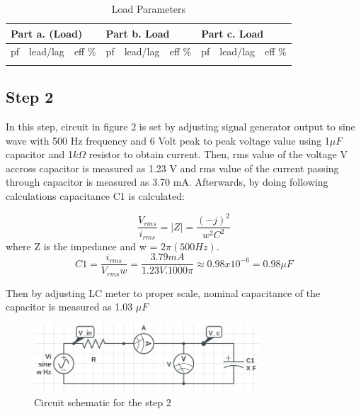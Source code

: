 \documentclass[letterpaper,12pt]{article}
\begin{document}
\begin{table}[H]
  \begin{center}
    \caption{Load Parameters}
    \vspace{2mm}
 \begin{tabular}{||lll|lll|lll||}
    \hline
    \multicolumn{3}{|l|}{Part a. (Load)}                            & \multicolumn{3}{l|}{Part b. Load}                            & \multicolumn{3}{l|}{Part c. Load}                            \\ \hline
    \multicolumn{1}{|l|}{pf} & \multicolumn{1}{l|}{lead/lag} & eff \(\%\) & \multicolumn{1}{l|}{pf} & \multicolumn{1}{l|}{lead/lag} &eff \(\%\)  & \multicolumn{1}{l|}{pf} & \multicolumn{1}{l|}{lead/lag} &eff \(\%\)  \\ \hline
    \multicolumn{1}{|l|}{} & \multicolumn{1}{l|}{} &  & \multicolumn{1}{l|}{} & \multicolumn{1}{l|}{} &  & \multicolumn{1}{l|}{} & \multicolumn{1}{l|}{} &  \\ \hline
    \end{tabular}
\end{center}

\end{table}
\subsection{Step 2}

In this step, circuit in figure 2 is set by adjusting signal generator output to sine wave with 500 Hz frequency and 6 Volt peak to peak voltage value using 1\(\mu F\) capacitor and 1\(k\Omega \) resistor to obtain current. Then, rms value of the voltage V accross capacitor is measured as 1.23 V and rms value of the current passing through capacitor is measured as 3.70 mA. Afterwards, by doing following calculations capacitance C1 is calculated:

\[\frac{V_{rms}}{i_{rms}} = |Z| = \frac{(-j)^2}{w^2C^2}\]
where Z is the impedance and w = \(2\pi (500 Hz)\).  
\[C1 = \frac{i_{rms}}{V_{rms}w}  =  \frac{3.79 mA}{1.23 V . 1000\pi} \approx 0.98x10^{-6} = 0.98 \mu F\]

Then by adjusting LC meter to proper scale, nominal capacitance of the capacitor is measured as 1.03 \(\mu F\)
\begin{figure}[H]
    \centering
    \includegraphics[width = 0.75\textwidth]{2SCH.png}
    \caption{Circuit schematic for the step 2}
\end{figure} 
    
\end{document}
